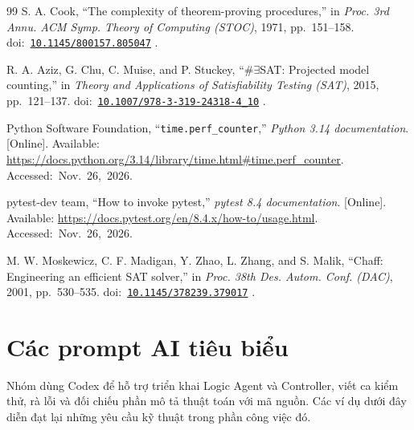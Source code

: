 \documentclass[11pt,a4paper]{article}
\newcommand{\doiref}[1]{%
  \mbox{doi: \href{https://doi.org/#1}{\nolinkurl{#1}}}%
}
\begin{document}
\begin{thebibliography}{99}
S. A. Cook,
“The complexity of theorem-proving procedures,”
in \emph{Proc. 3rd Annu. ACM Symp. Theory of Computing (STOC)},
1971, pp.~151--158.
\doiref{10.1145/800157.805047}.

R. A. Aziz, G. Chu, C. Muise, and P. Stuckey,
“\(\#\exists\)SAT: Projected model counting,”
in \emph{Theory and Applications of Satisfiability Testing (SAT)},
2015, pp.~121--137.
\doiref{10.1007/978-3-319-24318-4_10}.

Python Software Foundation,
“\texttt{time.perf\_counter},”
\emph{Python 3.14 documentation}.
[Online]. Available:
\url{https://docs.python.org/3.14/library/time.html#time.perf_counter}.
\mbox{Accessed: Nov.~26, 2026.}

pytest-dev team,
“How to invoke pytest,”
\emph{pytest 8.4 documentation}.
[Online]. Available:
\url{https://docs.pytest.org/en/8.4.x/how-to/usage.html}.
\mbox{Accessed: Nov.~26, 2026.}

M. W. Moskewicz, C. F. Madigan, Y. Zhao, L. Zhang, and S. Malik,
“Chaff: Engineering an efficient SAT solver,”
in \emph{Proc. 38th Des. Autom. Conf. (DAC)},
2001, pp.~530--535.
\doiref{10.1145/378239.379017}.

\end{thebibliography}

\clearpage

\appendix

\section{Các prompt AI tiêu biểu}

Nhóm dùng Codex để hỗ trợ triển khai Logic Agent và Controller,
viết ca kiểm thử, rà lỗi và đối chiếu phần mô tả thuật toán với
mã nguồn.
Các ví dụ dưới đây diễn đạt lại những yêu cầu kỹ thuật trong
phần công việc đó.
\end{document}
